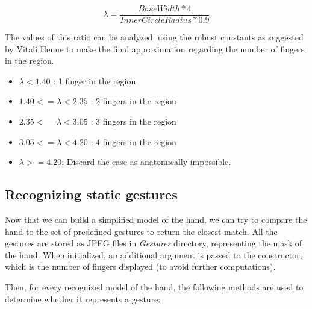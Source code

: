 \documentclass[a4paper,11pt,oneside]{article}
\begin{document}
\[\lambda = \frac{BaseWidth * 4}{InnerCircleRadius * 0.9} \]

The values of this ratio can be analyzed, using the robust constants as suggested by Vitali Henne \cite{VH01} to make the final approximation regarding the number of fingers in the region.

\begin{itemize}
\item $\lambda < 1.40$ : 1 finger in the region
\item $1.40 <= \lambda < 2.35$ : 2 fingers in the region
\item $2.35 <= \lambda < 3.05$ : 3 fingers in the region
\item $3.05 <= \lambda < 4.20$ : 4 fingers in the region
\item $\lambda >= 4.20$: Discard the case as anatomically impossible.
\end{itemize}
 
\subsection{Recognizing static gestures}
  
Now that we can build a simplified model of the hand, we can try to compare the hand to the set of predefined gestures to return the closest match. All the gestures are stored as JPEG files in \textit{Gestures} directory, representing the mask of the hand. When initialized, an additional argument is passed to the constructor, which is the number of fingers displayed (to avoid further computations).

Then, for every recognized model of the hand, the following methods are used to determine whether it represents a gesture:\\
\end{document}
